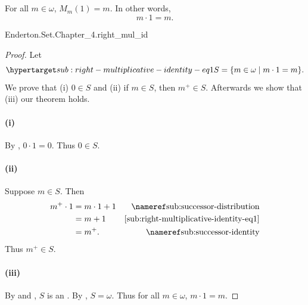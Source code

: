 \documentclass{report}
\begin{document}
\subsection{}%

  \begin{lemma}
    For all $m \in \omega$, $M_m(1) = m$.
    In other words, $$m \cdot 1 = m.$$
  \end{lemma}

    {Enderton.Set.Chapter\_4.right\_mul\_id}


  \begin{proof}

    Let
      \begin{equation}
        \hyperlabel{sub:right-multiplicative-identity-eq1}
        S = \{m \in \omega \mid m \cdot 1 = m\}.
      \end{equation}
    We prove that (i) $0 \in S$ and (ii) if $m \in S$, then $m^+ \in S$.
    Afterwards we show that (iii) our theorem holds.

    \paragraph{(i)}%

      By , $0 \cdot 1 = 0$.
      Thus $0 \in S$.

    \paragraph{(ii)}%

      Suppose $m \in S$.
      Then
        \begin{align*}
          m^+ \cdot 1
            & = m \cdot 1 + 1 & \textref{sub:successor-distribution} \\
            & = m + 1 & \eqref{sub:right-multiplicative-identity-eq1} \\
            & = m^+. & \textref{sub:successor-identity}
        \end{align*}
      Thus $m^+ \in S$.

    \paragraph{(iii)}%

      By  and
        , $S$
        is an .
      By , $S = \omega$.
      Thus for all $m \in \omega$, $m \cdot 1 = m$.

  \end{proof}
\end{document}
